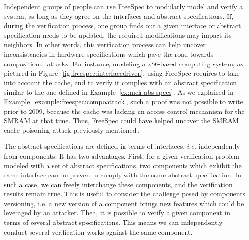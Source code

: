 Independent groups of people can use FreeSpec to modularly model and verify a
system, as long as they agree on the interfaces and abstract specifications.
%
If, during the verification process, one group finds out a given interface or
abstract specification needs to be updated, the required modifications may
impact its neighbors.
%
In other words, this verification process can help uncover inconsistencies in
hardware specifications which pave the road towards compositional attacks.
%
For instance, modeling a x86-based computing system, as pictured in
Figure~\ref{fig:freespec:interfacedriven}, using FreeSpec requires to take into
account the cache, and to verify it complies with an abstract specification
similar to the one defined in Example~\ref{ex:mch-abs-specs}.
%
As we explained in Example~\ref{example:freespec:compoattack}, such a proof was
not possible to write prior to 2009, because the cache was lacking an access
control mechanism for the SMRAM at that time.
%
Thus, FreeSpec could have helped uncover the SMRAM cache poisoning attack
previously mentioned\,\cite{wojtczuk2009smram,duflot2009smram}.

The abstract specifications are defined in terms of interfaces, \emph{i.e.}
independently from components.
%
It has two advantages.
%
First, for a given verification problem modeled with a set of abstract
specifications, two components which exhibit the same interface can be proven to
comply with the same abstract specification.
%
In such a case, we can freely interchange these components, and the verification
results remain true.
%
This is useful to consider the challenge posed by components versioning, i.e. a
new version of a component brings new features which could be leveraged by an
attacker.
%
Then, it is possible to verify a given component in terms of several abstract
specifications.
%
This means we can independently conduct several verification works against the
same component.
